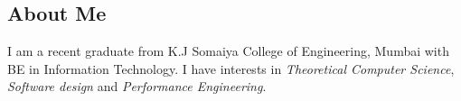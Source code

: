 \documentclass[12pt,a4paper,sans]{moderncv}
\begin{document}
 	\makecvtitle
 	\subsection{\hspace{10em} About Me} %
	I am a recent graduate from K.J Somaiya College of Engineering, Mumbai with BE in Information Technology. I have interests in \emph{Theoretical Computer Science}, \emph{Software design} and \emph{Performance Engineering}.  
	 
	 
	 
	 \vspace{-20pt} %
	 
	 

 
\end{document}
